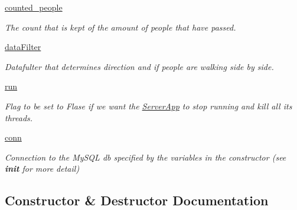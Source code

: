 \begin{DoxyCompactItemize}
\mbox{\hyperlink{class_server_app_1_1_server_app_a108fcfaa44a437b4a2a8fede99da06ea}{counted\+\_\+people}}
\begin{DoxyCompactList}\small\item\em The count that is kept of the amount of people that have passed. \end{DoxyCompactList}\item 
\mbox{\label{class_server_app_1_1_server_app_a91855cac79a63ea9e2f260d9ae2a6179}} 
\mbox{\hyperlink{class_server_app_1_1_server_app_a91855cac79a63ea9e2f260d9ae2a6179}{data\+Filter}}
\begin{DoxyCompactList}\small\item\em Datafulter that determines direction and if people are walking side by side. \end{DoxyCompactList}\item 
\mbox{\hyperlink{class_server_app_1_1_server_app_aa3d45986c6c5a318fe81ec68cb794444}{run}}
\begin{DoxyCompactList}\small\item\em Flag to be set to Flase if we want the \mbox{\hyperlink{class_server_app_1_1_server_app}{Server\+App}} to stop running and kill all it\textquotesingle{}s threads. \end{DoxyCompactList}\item 
\mbox{\label{class_server_app_1_1_server_app_a873b13faee0ebe503e91daddf42f013b}} 
\mbox{\hyperlink{class_server_app_1_1_server_app_a873b13faee0ebe503e91daddf42f013b}{conn}}
\begin{DoxyCompactList}\small\item\em Connection to the My\+S\+QL db specified by the variables in the constructor (see {\bfseries init} for more detail) \end{DoxyCompactList}\end{DoxyCompactItemize}


\subsection{Constructor \& Destructor Documentation}
\mbox{\label{class_server_app_1_1_server_app_ad21d376322b7fed132f39b87d23ccaea}} 
